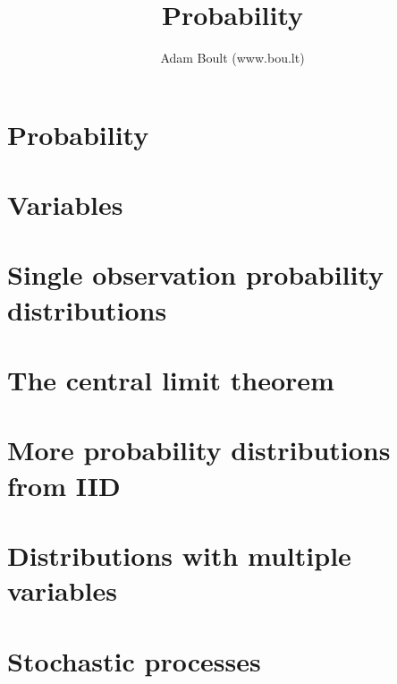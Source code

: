 \documentclass[oneside]{book}
\begin{document}
\author{Adam Boult (www.bou.lt)}
\title{Probability}
\maketitle

\setcounter{tocdepth}{0}
\tableofcontents



\part{Probability}




\part{Variables}







\part{Single observation probability distributions}



\part{The central limit theorem}





\part{More probability distributions from IID}







\part{Distributions with multiple variables}


\part{Stochastic processes}








\end{document}
